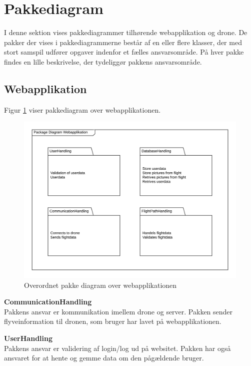 \section{Pakkediagram}

I denne sektion vises pakkediagrammer tilhørende webapplikation og drone. De pakker der vises i pakkediagrammerne består af en eller flere klasser, der med stort samspil udfører opgaver indenfor et fælles ansvarsområde. På hver pakke findes en lille beskrivelse, der tydeliggør pakkens ansvarsområde.

\subsection{Webapplikation}
Figur \ref{fig:pakke_diagram_webapp} viser pakkediagram over webapplikationen. 

\vspace{-5pt}
\begin{figure}[H]
	\centering
	\includegraphics[width=1\textwidth]{Billeder/pakke_diagrammer/package_diagram_webapp.png}
	\vspace{-1cm}
	\caption{Overordnet pakke diagram over webapplikationen}
	\label{fig:pakke_diagram_webapp}
\end{figure}

\textbf{CommunicationHandling}\\
Pakkens ansvar er kommunikation imellem drone og server. Pakken sender flyveinformation til dronen, som bruger har lavet på webapplikationen.

\textbf{UserHandling}\\
Pakkens ansvar er validering af login/log ud på websitet. Pakken har også ansvaret for at hente og gemme data om den pågældende bruger.

